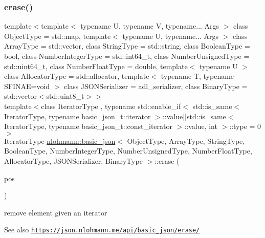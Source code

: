 \subsubsection{\texorpdfstring{erase()}{erase()}\hspace{0.1cm}{\footnotesize\ttfamily [1/4]}}
{\footnotesize\ttfamily template$<$template$<$ typename U, typename V, typename... Args $>$ class Object\+Type = std\+::map, template$<$ typename U, typename... Args $>$ class Array\+Type = std\+::vector, class String\+Type  = std\+::string, class Boolean\+Type  = bool, class Number\+Integer\+Type  = std\+::int64\+\_\+t, class Number\+Unsigned\+Type  = std\+::uint64\+\_\+t, class Number\+Float\+Type  = double, template$<$ typename U $>$ class Allocator\+Type = std\+::allocator, template$<$ typename T, typename S\+F\+I\+N\+A\+E=void $>$ class J\+S\+O\+N\+Serializer = adl\+\_\+serializer, class Binary\+Type  = std\+::vector$<$std\+::uint8\+\_\+t$>$$>$ \\
template$<$class Iterator\+Type , typename std\+::enable\+\_\+if$<$ std\+::is\+\_\+same$<$ Iterator\+Type, typename basic\+\_\+json\+\_\+t\+::iterator $>$\+::value$\vert$$\vert$std\+::is\+\_\+same$<$ Iterator\+Type, typename basic\+\_\+json\+\_\+t\+::const\+\_\+iterator $>$\+::value, int $>$\+::type  = 0$>$ \\
Iterator\+Type \hyperlink{classnlohmann_1_1basic__json}{nlohmann\+::basic\+\_\+json}$<$ Object\+Type, Array\+Type, String\+Type, Boolean\+Type, Number\+Integer\+Type, Number\+Unsigned\+Type, Number\+Float\+Type, Allocator\+Type, J\+S\+O\+N\+Serializer, Binary\+Type $>$\+::erase (\begin{DoxyParamCaption}\item[{Iterator\+Type}]{pos }\end{DoxyParamCaption})\hspace{0.3cm}{\ttfamily [inline]}}



remove element given an iterator 

\begin{DoxySeeAlso}{See also}
\href{https://json.nlohmann.me/api/basic_json/erase/}{\tt https\+://json.\+nlohmann.\+me/api/basic\+\_\+json/erase/} 
\end{DoxySeeAlso}
\mbox{\label{classnlohmann_1_1basic__json_a8ac83750e267e37d5d47591eb44cce42}} 
